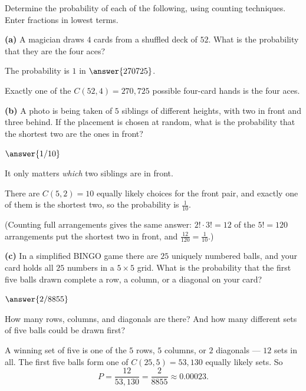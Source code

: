 \documentclass[12pt]{ximera}
\begin{document}
\begin{problem}
Determine the probability of each of the following, using counting techniques. Enter
fractions in lowest terms.

\begin{prompt}
\textbf{(a)} A magician draws $4$ cards from a shuffled deck of $52$. What is the
probability that they are the four aces?

The probability is $1$ in $\answer{270725}$.

\begin{feedback}
Exactly one of the $C(52,4)=270{,}725$ possible four-card hands is the four aces.
\end{feedback}
\end{prompt}

\begin{prompt}
\textbf{(b)} A photo is being taken of $5$ siblings of different heights, with two in
front and three behind. If the placement is chosen at random, what is the probability
that the shortest two are the ones in front?

$\answer{1/10}$

\begin{hint}
It only matters \emph{which} two siblings are in front.
\end{hint}

\begin{feedback}
There are $C(5,2)=10$ equally likely choices for the front pair, and exactly one of
them is the shortest two, so the probability is $\frac{1}{10}$.

(Counting full arrangements gives the same answer: $2!\cdot 3!=12$ of the $5!=120$
arrangements put the shortest two in front, and $\frac{12}{120}=\frac1{10}$.)
\end{feedback}
\end{prompt}

\begin{prompt}
\textbf{(c)} In a simplified BINGO game there are $25$ uniquely numbered balls, and your
card holds all $25$ numbers in a $5\times 5$ grid. What is the probability that the first
five balls drawn complete a row, a column, or a diagonal on your card?

$\answer{2/8855}$

\begin{hint}
How many rows, columns, and diagonals are there? And how many different sets of five
balls could be drawn first?
\end{hint}

\begin{feedback}
A winning set of five is one of the $5$ rows, $5$ columns, or $2$ diagonals --- $12$
sets in all. The first five balls form one of $C(25,5)=53{,}130$ equally likely sets.
So
\[ P=\frac{12}{53{,}130}=\frac{2}{8855}\approx 0.00023. \]
\end{feedback}
\end{prompt}
\end{problem}
\end{document}
